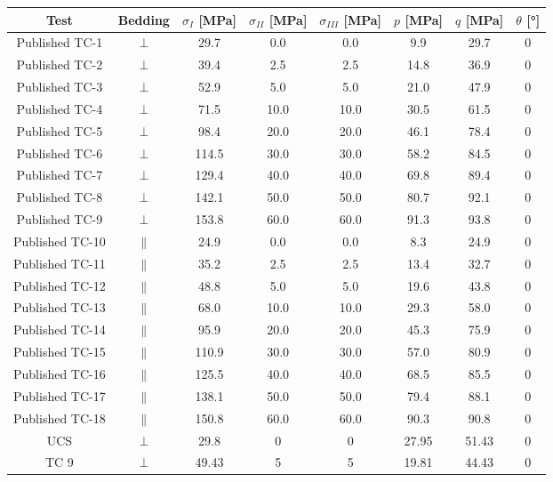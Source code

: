 \begin{table}
    \centering
    \begin{tabular}{cccccccc}
        \hline 
        Test & Bedding & $\sigma_I$ [\si{MPa}] & $\sigma_{II}$ [\si{MPa}] &$\sigma_{III}$ [\si{MPa}] & $p$ [\si{MPa}] & $q$ [\si{MPa}] & $\theta$ [\si{\degree}] \\
        \hline
        \hline
        Published TC-1 & \(\perp\) & 29.7 & 0.0 & 0.0 & 9.9 & 29.7 & 0 \\
        Published TC-2 & \(\perp\) & 39.4 & 2.5 & 2.5 & 14.8 & 36.9 & 0 \\
        Published TC-3 & \(\perp\) & 52.9 & 5.0 & 5.0 & 21.0 & 47.9 & 0 \\
        Published TC-4 & \(\perp\) & 71.5 & 10.0 & 10.0 & 30.5 & 61.5 & 0 \\
        Published TC-5 & \(\perp\) & 98.4 & 20.0 & 20.0 & 46.1 & 78.4 & 0 \\
        Published TC-6 & \(\perp\) & 114.5 & 30.0 & 30.0 & 58.2 & 84.5 & 0 \\
        Published TC-7 & \(\perp\)& 129.4 & 40.0 & 40.0 & 69.8 & 89.4 & 0 \\
        Published TC-8 & \(\perp\) & 142.1 & 50.0 & 50.0 & 80.7 & 92.1 & 0 \\
        Published TC-9 & \(\perp\) & 153.8 & 60.0 & 60.0 & 91.3 & 93.8 & 0 \\
        Published TC-10 & \(\|\) & 24.9 & 0.0 & 0.0 & 8.3 & 24.9 & 0 \\
        Published TC-11 & \(\|\) & 35.2 & 2.5 & 2.5 & 13.4 & 32.7 & 0 \\
        Published TC-12 & \(\|\) & 48.8 & 5.0 & 5.0 & 19.6 & 43.8 & 0 \\
        Published TC-13 & \(\|\) & 68.0 & 10.0 & 10.0 & 29.3 & 58.0 & 0 \\
        Published TC-14 & \(\|\) & 95.9 & 20.0 & 20.0 & 45.3 & 75.9 & 0 \\
        Published TC-15 & \(\|\) & 110.9 & 30.0 & 30.0 & 57.0 & 80.9 & 0 \\
        Published TC-16 & \(\|\) & 125.5 & 40.0 & 40.0 & 68.5 & 85.5 & 0 \\
        Published TC-17 & \(\|\) & 138.1 & 50.0 & 50.0 & 79.4 & 88.1 & 0 \\
        Published TC-18 & \(\|\) & 150.8 & 60.0 & 60.0 & 90.3 & 90.8 & 0 \\
        UCS   & \(\perp\) & 29.8 & 0 & 0   & 27.95 & 51.43 & 0 \\ 
        TC 9  & \(\perp\) & 49.43 & 5  & 5 & 19.81 & 44.43 & 0 \\ 

\end{tabular}
\end{table}
